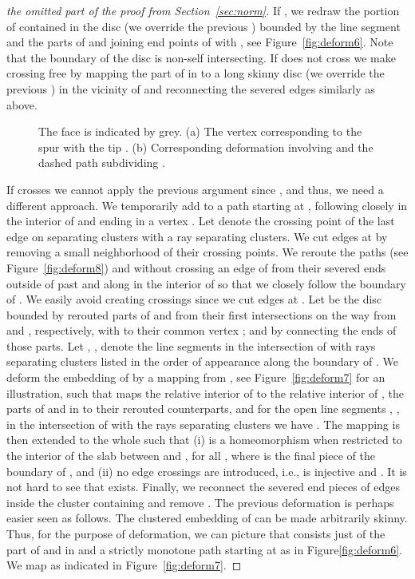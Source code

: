 \documentclass{llncs}
\begin{document}
\begin{proof}[the omitted part of the proof from Section~\ref{sec:norm}]
If , we redraw the portion of  contained in the disc  (we override the previous ) bounded by the line segment 
and the parts of  and  joining end points of   with , see Figure~\ref{fig:deform6}.
Note that the boundary of the disc  is non-self intersecting.
If  does not cross  we make  crossing free by mapping
the part of  in  to a long skinny disc   (we override the previous ) in the vicinity of  and reconnecting the severed edges similarly 
as above.

 \begin{figure}
  \centering
\centering
{}
    	\hspace{1px}
\caption{The face  is indicated by grey. (a) The vertex   corresponding to the spur with the tip . (b) Corresponding  deformation involving  and the dashed path  subdividing .}
\end{figure}



If  crosses  we cannot apply the previous argument since ,
and thus, we need a different approach.
We temporarily add to  a path  starting at , following closely  in the interior of 
and ending in a vertex . Let  denote the crossing point of the last edge on 
separating clusters with a ray separating clusters. 
We cut edges at  by removing a small  neighborhood of their crossing points.
We reroute the paths   (see Figure~\ref{fig:deform8}) and  without crossing an edge of  from their severed ends outside of  past  and along  in the interior of  so that we closely follow the boundary of .
We  easily avoid creating crossings since we cut edges at .
Let   be the disc bounded by rerouted parts of  and  from their first intersections on the way from  and , respectively, with  to their common vertex ; and by  connecting the ends of those parts.
Let , , denote the line segments in the intersection of  with rays separating clusters listed in the order of appearance along the boundary of .
We deform the embedding of  by a mapping  from , see Figure~\ref{fig:deform7} for an illustration, such that  maps the relative interior of  to the relative interior of  , the parts of  and  in  to their rerouted counterparts, and for the open line segments , , in the intersection of  with the rays separating clusters we have .
The mapping  is then extended to the whole  such that (i)  is a homeomorphism when restricted to the interior
of the slab between  and , for all , where  is the 
final piece of the boundary of , and (ii) no edge crossings are introduced, i.e.,  is injective
and . It is not hard to see that  exists. Finally, we reconnect the severed end pieces of edges inside the cluster
containing  and remove .
The previous deformation is perhaps easier seen as follows. The clustered embedding of  can be made  arbitrarily skinny. Thus, for the purpose of  deformation, we can picture that  consists just of the part of  and  in  and a strictly monotone 
path starting at   as in Figure\ref{fig:deform6}. We map  as indicated in Figure~\ref{fig:deform7}.
 

\end{proof}
\end{document}
